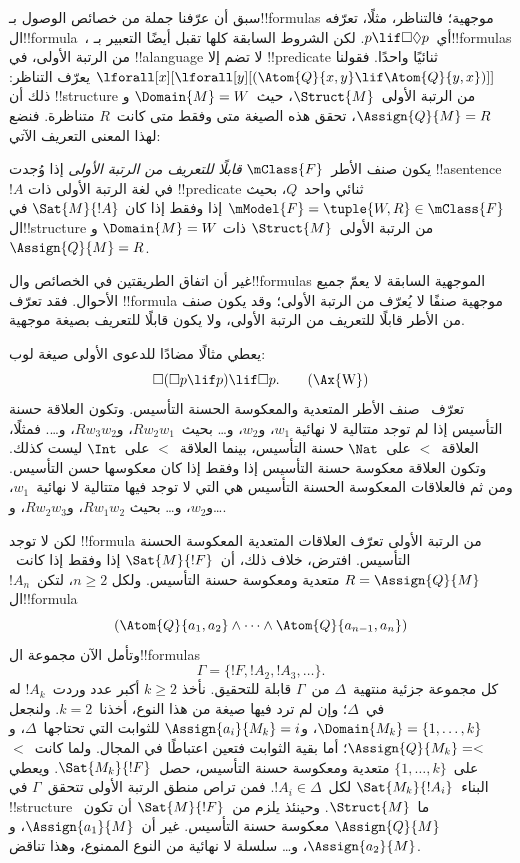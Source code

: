 \documentclass[../../../include/open-logic-section]{subfiles}
\begin{document}


سبق أن عرّفنا جملة من خصائص الوصول بـ!!{formula}s موجهية؛
فالتناظر، مثلًا، تعرّفه ال!!{formula}~، أي~$p \lif \Box\Diamond p$.
لكن الشروط السابقة كلها تقبل أيضًا التعبير بـ!!{formula}s من
الرتبة الأولى، في !!a{language} لا تضم إلا !!{predicate} ثنائيًا
واحدًا. فقولنا
$\lforall[x][\lforall[y][(\Atom{Q}{x,y} \lif \Atom{Q}{y, x})]]$
يعرّف التناظر: ذلك أن !!{structure} من الرتبة الأولى~$\Struct{M}$،
حيث~$\Domain{M} = W$ و$\Assign{Q}{M} = R$، تحقق هذه الصيغة
متى وفقط متى كانت~$R$ متناظرة. فنضع لهذا المعنى التعريف الآتي:

\begin{defn}
  يكون صنف الأطر~$\mClass{F}$ \emph{قابلًا للتعريف من الرتبة الأولى}
  إذا وُجدت !!a{sentence}~$!A$ في لغة الرتبة الأولى ذات
  !!{predicate} ثنائي واحد~$Q$، بحيث
  $\mModel{F} = \tuple{W, R} \in \mClass{F}$ إذا وفقط إذا كان
  $\Sat{M}{!A}$ في ال!!{structure} من الرتبة الأولى~$\Struct{M}$ ذات
  $\Domain{M} = W$ و$\Assign{Q}{M} = R$.
\end{defn}

غير أن اتفاق الطريقتين في الخصائص وال!!{formula}s الموجهية
السابقة لا يعمّ جميع الأحوال. فقد تعرّف !!{formula} موجهية صنفًا
لا يُعرّف من الرتبة الأولى؛ وقد يكون صنف من الأطر قابلًا للتعريف
من الرتبة الأولى، ولا يكون قابلًا للتعريف بصيغة موجهية.

يعطي مثالًا مضادًا للدعوى الأولى صيغة لوب:
\begin{equation}
\Box(\Box p \lif p) \lif \Box p. \tag{\Ax{W}}
\end{equation}
تعرّف~ صنف الأطر المتعدية والمعكوسة الحسنة التأسيس. وتكون
العلاقة حسنة التأسيس إذا لم توجد متتالية لا نهائية
$w_1$، و$w_2$، و\dots{} بحيث~$Rw_2w_1$، و$Rw_3w_2$، و\dots. فمثلًا،
العلاقة~$<$ على~$\Nat$ حسنة التأسيس، بينما العلاقة~$<$ على~$\Int$
ليست كذلك. وتكون العلاقة معكوسة حسنة التأسيس إذا وفقط إذا كان
معكوسها حسن التأسيس. ومن ثم فالعلاقات المعكوسة الحسنة التأسيس هي التي
لا توجد فيها متتالية لا نهائية~$w_1$، و$w_2$، و\dots{} بحيث
$Rw_1w_2$، و$Rw_2w_3$، و\dots.

لكن لا توجد !!{formula} من الرتبة الأولى تعرّف العلاقات المتعدية
المعكوسة الحسنة التأسيس. افترض، خلاف ذلك، أن~$\Sat{M}{!F}$ إذا وفقط
إذا كانت~$R = \Assign{Q}{M}$ متعدية ومعكوسة حسنة التأسيس. ولكل
$n \ge 2$، لتكن~$!A_n$ ال!!{formula}
\[
(\Atom{Q}{a_1,a_2} \land \dots \land
    \Atom{Q}{a_{n-1},a_{n}})
\]
وتأمل الآن مجموعة ال!!{formula}s
\[
\Gamma = \{!F, !A_2, !A_3, \dots\}.
\]
كل مجموعة جزئية منتهية~$\Delta$ من~$\Gamma$ قابلة للتحقيق. نأخذ
$k \ge 2$ أكبر عدد وردت~$!A_k$ له في~$\Delta$؛ وإن لم ترد فيها
صيغة من هذا النوع، أخذنا~$k=2$. ولنجعل
$\Domain{M_k} = \{1, \dots, k\}$، و$\Assign{a_i}{M_k} = i$
للثوابت التي تحتاجها~$\Delta$، و$\Assign{Q}{M_k} = <$؛
أما بقية الثوابت فتعين اعتباطًا في المجال.
ولما كانت~$<$ على~$\{1, \dots, k\}$ متعدية ومعكوسة حسنة التأسيس،
حصل~$\Sat{M_k}{!F}$. ويعطي البناء~$\Sat{M_k}{!A_i}$
لكل~$!A_i \in \Delta$. فمن تراص منطق الرتبة الأولى تتحقق~$\Gamma$
في !!{structure} ما~$\Struct{M}$. وحينئذ يلزم من~$\Sat{M}{!F}$
أن تكون~$\Assign{Q}{M}$ معكوسة حسنة التأسيس.
غير أن~$\Assign{a_1}{M}$، و$\Assign{a_2}{M}$، و\dots{}
سلسلة لا نهائية من النوع الممنوع، وهذا تناقض.
\end{document}

